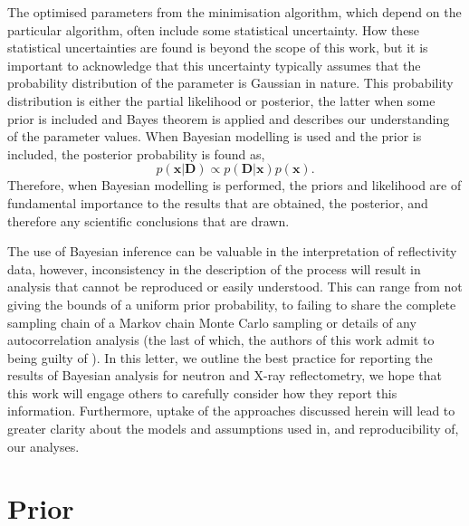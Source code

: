 \documentclass[reprint,superscriptaddress,aps,amsmath,linenumbers]{revtex4-2}
\begin{document}
The optimised parameters from the minimisation algorithm, which depend on the particular algorithm, often include some statistical uncertainty. 
How these statistical uncertainties are found is beyond the scope of this work, but it is important to acknowledge that this uncertainty typically assumes that the probability distribution of the parameter is Gaussian in nature. 
This probability distribution is either the partial likelihood or posterior, the latter when some prior is included and Bayes theorem is applied and describes our understanding of the parameter values. 
When Bayesian modelling is used and the prior is included, the posterior probability is found as, 
%
\begin{equation}
  p(\mathbf{x} | \mathbf{D}) \propto p(\mathbf{D} | \mathbf{x}) p(\mathbf{x}).
  \label{equ:bayes}
\end{equation}
%
Therefore, when Bayesian modelling is performed, the priors and likelihood are of fundamental importance to the results that are obtained, the posterior, and therefore any scientific conclusions that are drawn. 

The use of Bayesian inference can be valuable in the interpretation of reflectivity data, however, inconsistency in the description of the process will result in analysis that cannot be reproduced or easily understood. 
This can range from not giving the bounds of a uniform prior probability, to failing to share the complete sampling chain of a Markov chain Monte Carlo sampling or details of any autocorrelation analysis (the last of which, the authors of this work admit to being guilty of \cite{mccluskey_bayesian_2019}). 
In this letter, we outline the best practice for reporting the results of Bayesian analysis for neutron and X-ray reflectometry, we hope that this work will engage others to carefully consider how they report this information. 
Furthermore, uptake of the approaches discussed herein will lead to greater clarity about the models and assumptions used in, and reproducibility of, our analyses.

\section{Prior}
\label{sec:prior}
\end{document}
